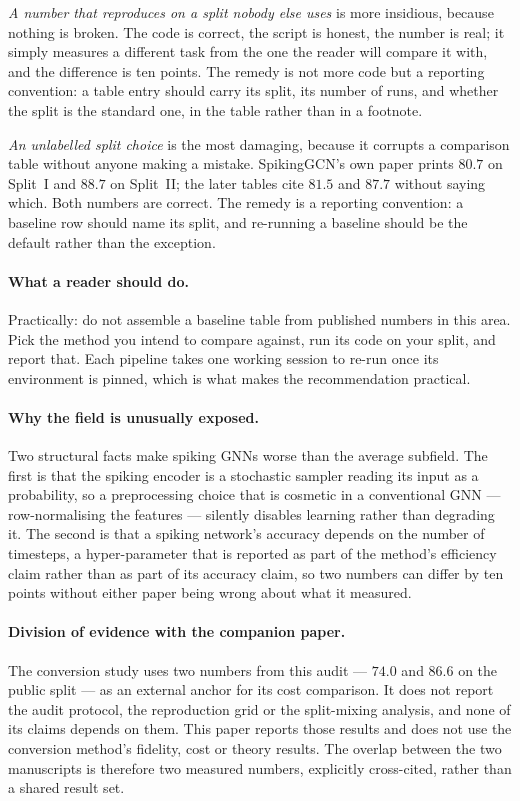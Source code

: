 \documentclass[10pt,twocolumn]{article}
\begin{document}
\emph{A number that reproduces on a split nobody else uses} is more insidious, because nothing is
broken. The code is correct, the script is honest, the number is real; it simply measures a different
task from the one the reader will compare it with, and the difference is ten points. The remedy is not
more code but a reporting convention: a table entry should carry its split, its number of runs, and
whether the split is the standard one, in the table rather than in a footnote.

\emph{An unlabelled split choice} is the most damaging, because it corrupts a comparison table
without anyone making a mistake. SpikingGCN's own paper prints $80.7$ on Split~I and $88.7$ on
Split~II; the later tables cite $81.5$ and $87.7$ without saying which. Both numbers are correct.
The remedy is a reporting convention: a baseline row should name its split, and re-running a baseline
should be the default rather than the exception.

\paragraph{What a reader should do.} Practically: do not assemble a baseline table from published
numbers in this area. Pick the method you intend to compare against, run its code on your split, and
report that. Each pipeline takes one working session to re-run once its environment is pinned,
which is what makes the recommendation practical.

\paragraph{Why the field is unusually exposed.} Two structural facts make spiking GNNs worse than the
average subfield. The first is that the spiking encoder is a stochastic sampler reading its input as a
probability, so a preprocessing choice that is cosmetic in a conventional GNN --- row-normalising the
features --- silently disables learning rather than degrading it. The second is that a spiking
network's accuracy depends on the number of timesteps, a hyper-parameter that is reported as part of
the method's efficiency claim rather than as part of its accuracy claim, so two numbers can differ by
ten points without either paper being wrong about what it measured.

\paragraph{Division of evidence with the companion paper.} The conversion study \citep{companion}
uses two numbers from this audit --- $74.0$ and $86.6$ on the public split --- as an external anchor
for its cost comparison. It does not report the audit protocol, the reproduction grid or the
split-mixing analysis, and none of its claims depends on them. This paper reports those results and
does not use the conversion method's fidelity, cost or theory results. The overlap between the two
manuscripts is therefore two measured numbers, explicitly cross-cited, rather than a shared result
set.
\end{document}
